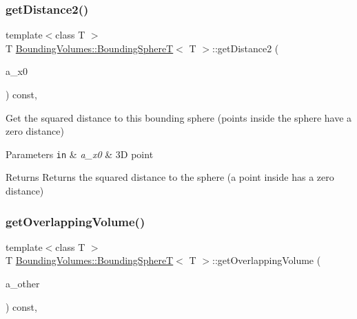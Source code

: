 \subsubsection{\texorpdfstring{get\+Distance2()}{getDistance2()}}
{\footnotesize\ttfamily template$<$class T $>$ \\
T \hyperlink{classBoundingVolumes_1_1BoundingSphereT}{Bounding\+Volumes\+::\+Bounding\+SphereT}$<$ T $>$\+::get\+Distance2 (\begin{DoxyParamCaption}\item[{const \hyperlink{classBoundingVolumes_1_1BoundingSphereT_ad89ed315255abcde216e9ca1de3068ab}{Vec3} \&}]{a\+\_\+x0 }\end{DoxyParamCaption}) const\hspace{0.3cm}{\ttfamily [inline]}, {\ttfamily [noexcept]}}



Get the squared distance to this bounding sphere (points inside the sphere have a zero distance) 


\begin{DoxyParams}[1]{Parameters}
\mbox{\tt in}  & {\em a\+\_\+x0} & 3D point \\
\hline
\end{DoxyParams}
\begin{DoxyReturn}{Returns}
Returns the squared distance to the sphere (a point inside has a zero distance) 
\end{DoxyReturn}
\mbox{\label{classBoundingVolumes_1_1BoundingSphereT_a4581b87c7a3ccd3b58168bfdae9436cb}} 
\subsubsection{\texorpdfstring{get\+Overlapping\+Volume()}{getOverlappingVolume()}}
{\footnotesize\ttfamily template$<$class T $>$ \\
T \hyperlink{classBoundingVolumes_1_1BoundingSphereT}{Bounding\+Volumes\+::\+Bounding\+SphereT}$<$ T $>$\+::get\+Overlapping\+Volume (\begin{DoxyParamCaption}\item[{const \hyperlink{classBoundingVolumes_1_1BoundingSphereT}{Bounding\+SphereT}$<$ T $>$ \&}]{a\+\_\+other }\end{DoxyParamCaption}) const\hspace{0.3cm}{\ttfamily [inline]}, {\ttfamily [noexcept]}}




